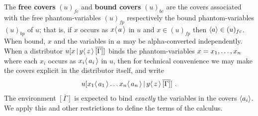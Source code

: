 \documentclass[runningheads]{llncs}
\let\vec\relax
\newcommand\defn{\textbf}
\newcommand{\fp}[1]{(#1)_{fp}}
\newcommand{\bp}[1]{(#1)_{bp}}
\newcommand{\fc}[1]{(#1)_{fc}}
\newcommand{\bc}[1]{(#1)_{bc}}
\newcommand{\dist}[5]{#1 [ #2 \, \vert \, \fakedist{#4}{#5} \, #3 ]}
\newcommand{\fakedist}[2]{#1 \langle \, #2 \, \rangle}
\begin{document}
\noindent
The \defn{free covers} $\fc{u}$ and \defn{bound covers} $\bc{u}$ are the covers associated with the free phantom-variables $\fp u$ respectively the bound phantom-variables $\bp u$ of $u$; that is, if $x$ occurs as $\fakedist x{\vec a}$ in $u$ and $x\in\fp{u}$ then $\langle\vec a\rangle\in\fc u$. When bound, $x$ and the variables in $\vec a$ may be alpha-converted independently. When a distributor $\dist u{\vec x}{\overline{[\Gamma]}}{y}{\vec{z}}$ binds the phantom-variables $\vec x=x_1,\dots,x_n$ where each $x_i$ occurs as $\fakedist{x_i}{\vec a_i}$ in $u$, then for technical convenience we may make the covers explicit in the distributor itself, and write
\[
	\dist{u}{\fakedist{x_1}{\vec a_1}\dots\fakedist{x_n}{\vec a_n}} {\overline{[\Gamma]}}{y}{\vec{z}}~.
\]
The environment $\overline{[\Gamma]}$ is expected to bind \emph{exactly} the variables in the covers $\langle\vec a_i\rangle$. We apply this and other restrictions to define the terms of the calculus.


\end{document}
